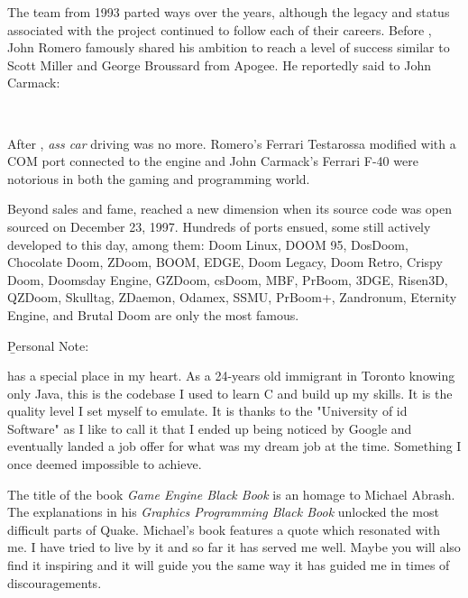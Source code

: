 The \doom{} team from 1993 parted ways over the years, although the legacy and status associated with the project continued to follow each of their careers. Before \doom{}, John Romero famously shared his ambition to reach a level of success similar to Scott Miller and George Broussard from Apogee. He reportedly said to John Carmack: \\
\par
 \\
 \par
After \doom{}, \textit{ass car} driving was no more. Romero's Ferrari Testarossa modified with a COM port connected to the engine and John Carmack's Ferrari F-40 were notorious in both the gaming and programming world.\\
\par
Beyond sales and fame, \doom{} reached a new dimension when its source code was open sourced on December 23, 1997. Hundreds of ports ensued, some still actively developed to this day, among them: Doom Linux, DOOM 95, DosDoom, Chocolate Doom, ZDoom, BOOM, EDGE, Doom Legacy, Doom Retro, Crispy Doom, Doomsday Engine, GZDoom, csDoom, MBF, PrBoom, 3DGE, Risen3D, QZDoom, Skulltag, ZDaemon, Odamex, SSMU, PrBoom+, Zandronum, Eternity Engine, and Brutal Doom are only the most famous.\\
\par
\vspace{10pt}
\b{Personal Note:}\\
\par
\doom{} has a special place in my heart. As a 24-years old immigrant in Toronto knowing only Java, this is the codebase I used to learn C and build up my skills. It is the quality level I set myself to emulate. It is thanks to the "University of id Software" as I like to call it that I ended up being noticed by Google and eventually landed a job offer for what was my dream job at the time. Something I once deemed impossible to achieve.\\
\par
The title of the book \textit{Game Engine Black Book} is an homage to Michael Abrash. The explanations in his \textit{Graphics Programming Black Book} unlocked the most difficult parts of Quake. Michael's book features a quote which resonated with me. I have tried to live by it and so far it has served me well. Maybe you will also find it inspiring and it will guide you the same way it has guided me in times of discouragements.\\
\par
{}

